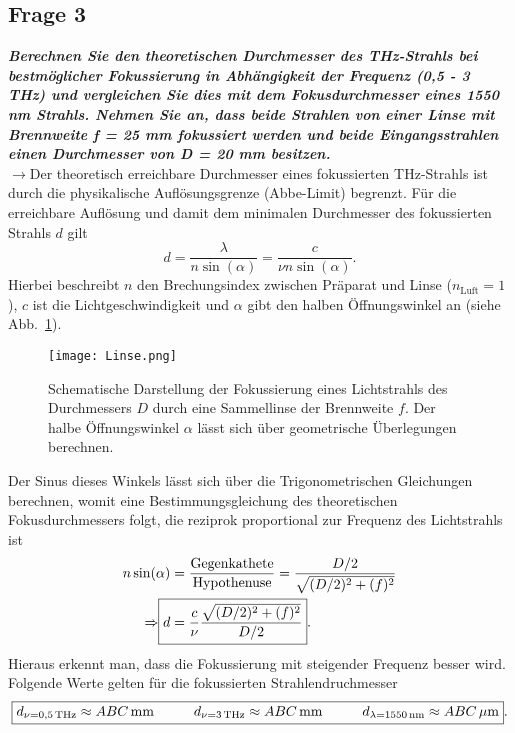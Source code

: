\subsection{\label{subsec:FZV3}Frage 3}
\textbf{\textit{Berechnen Sie den theoretischen Durchmesser des THz-Strahls bei bestmöglicher
Fokussierung in Abhängigkeit der Frequenz (0,5 - 3 THz) und vergleichen Sie dies
mit dem Fokusdurchmesser eines 1550 nm Strahls. Nehmen Sie an, dass beide
Strahlen von einer Linse mit Brennweite f = 25 mm fokussiert werden und beide
Eingangsstrahlen einen Durchmesser von D = 20 mm besitzen.}}\\
$\rightarrow$Der theoretisch erreichbare Durchmesser eines fokussierten THz-Strahls ist durch 
die physikalische Auflösungsgrenze (Abbe-Limit) begrenzt. Für die erreichbare 
Auflösung und damit dem minimalen Durchmesser des fokussierten Strahls $d$ gilt
\begin{equation}
    d = \frac{\lambda}{n\sin(\alpha)} = \frac{c}{\nu n\sin(\alpha)}.
\end{equation} 
Hierbei beschreibt $n$ den Brechungsindex zwischen Präparat und Linse ($n_{\text{Luft}}=1$), $c$ ist die Lichtgeschwindigkeit und 
$\alpha$ gibt den halben Öffnungswinkel an (siehe Abb.~\ref{fig:abbe}). 
\begin{figure}[h!]
    \centering
    \texttt{[image: Linse.png]}
    \caption{\label{fig:abbe}Schematische Darstellung der Fokussierung eines Lichtstrahls des Durchmessers $D$
    durch eine Sammellinse der Brennweite $f$. Der halbe Öffnungswinkel $\alpha$ lässt sich 
    über geometrische Überlegungen berechnen.}
\end{figure}\FloatBarrier
Der Sinus dieses Winkels lässt sich über die Trigonometrischen Gleichungen berechnen, womit 
eine Bestimmungsgleichung des theoretischen Fokusdurchmessers folgt, die reziprok proportional zur 
Frequenz des Lichtstrahls ist
\begin{align}
    n\sin(\alpha) &= \frac{\text{Gegenkathete}}{\text{Hypothenuse}} = \frac{D/2}{\sqrt{(D/2)^{2} + (f)^{2}}} \\
    \Rightarrow\Aboxed{d &= \frac{c}{\nu}\frac{\sqrt{(D/2)^{2} + (f)^{2}}}{D/2}}.
\end{align}
Hieraus erkennt man, dass die Fokussierung mit steigender Frequenz besser wird.
Folgende Werte gelten für die fokussierten Strahlendruchmesser
\begin{equation}
    \fbox{$d_{\nu=0,5\,\si{THz}} \approx ABC\,\si{mm}\hspace{1cm}d_{\nu=3\,\si{THz}} \approx ABC\,\si{mm}
    \hspace{1cm}d_{\lambda=1550\,\si{nm}} \approx ABC\,\si{\mu m}$}.
\end{equation}
